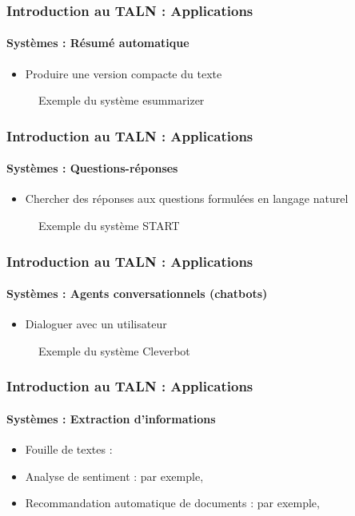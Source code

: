 \documentclass[xcolor=table]{beamer}
\begin{document}
\begin{frame}
\frametitle{Introduction au TALN : Applications}
\framesubtitle{Systèmes : Résumé automatique}

\begin{itemize}
	\item Produire une version compacte du texte
\end{itemize}

\begin{figure}
	\caption{Exemple du système esummarizer}
\end{figure}

\end{frame}

\begin{frame}
\frametitle{Introduction au TALN : Applications}
\framesubtitle{Systèmes : Questions-réponses}

\begin{itemize}
	\item Chercher des réponses aux questions formulées en langage naturel
\end{itemize}

\begin{figure}
	\caption{Exemple du système START}
\end{figure}

\end{frame}

\begin{frame}
\frametitle{Introduction au TALN : Applications}
\framesubtitle{Systèmes : Agents conversationnels (chatbots)}

\begin{itemize}
	\item Dialoguer avec un utilisateur
\end{itemize}

\begin{figure}
	\centering
	\caption{Exemple du système Cleverbot}
\end{figure}

\end{frame}

\begin{frame}
\frametitle{Introduction au TALN : Applications}
\framesubtitle{Systèmes : Extraction d'informations}

\begin{itemize}
	\item Fouille de textes : 
	\item Analyse de sentiment : par exemple, 
	\item Recommandation automatique de documents : par exemple, 
\end{itemize}

\end{frame}
\end{document}
